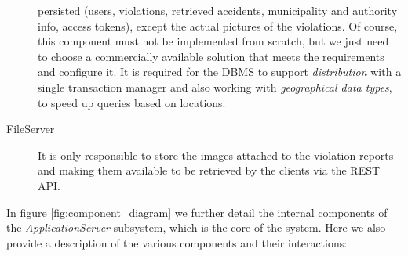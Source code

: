 \begin{description}
    persisted (users, violations, retrieved accidents, municipality and
    authority info, access tokens), except the actual pictures of the
    violations. Of course, this component must not be implemented from scratch,
    but we just need to choose a commercially available solution that meets the
    requirements and configure it. It is required for the DBMS to support
    \emph{distribution} with a single transaction manager and also working with
    \emph{geographical data types}, to speed up queries based on locations.
    \item[FileServer] It is only responsible to store the images attached to
    the violation reports and making them available to be retrieved by the
    clients via the REST API.
\end{description}

\noindent
In figure \vref{fig:component_diagram} we further detail the internal components
of the \emph{ApplicationServer} subsystem, which is the core of the system.
Here we also provide a description of the various components and their
interactions:
